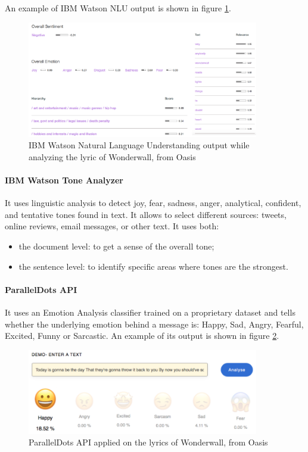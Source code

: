 An example of IBM Watson NLU output is shown in figure \ref{fig:ibm_watson_wonderwall}.

\begin{figure}[H]
\centering
\includegraphics[width=0.9\textwidth]{./chapters/chapter3/images/ibm-watson-wonderwall}
\caption{IBM Watson Natural Language Understanding output while analyzing the lyric of Wonderwall, from Oasis}
\label{fig:ibm_watson_wonderwall}
\end{figure}

\paragraph{IBM Watson Tone Analyzer}\cite{ibm_watson_tone}
It uses linguistic analysis to detect joy, fear, sadness, anger, analytical, confident, and tentative tones found in text. It allows to select different sources: tweets, online reviews, email messages, or other text. It uses both:
\begin{itemize}
\item the document level: to get a sense of the overall tone;
\item the sentence level: to identify specific areas where tones are the strongest.
\end{itemize}

\paragraph{ParallelDots API}\cite{paralleldots}
It uses an Emotion Analysis classifier trained on a proprietary dataset and tells whether the underlying emotion behind a message is: Happy,
Sad, Angry, Fearful, Excited, Funny or Sarcastic. An example of its output is shown in figure \ref{fig:paralleldots}.

\begin{figure}[H]
\centering
\includegraphics[width=0.9\textwidth]{./chapters/chapter3/images/paralleldots}
\caption{ParallelDots API applied on the lyrics of Wonderwall, from Oasis}
\label{fig:paralleldots}
\end{figure}


